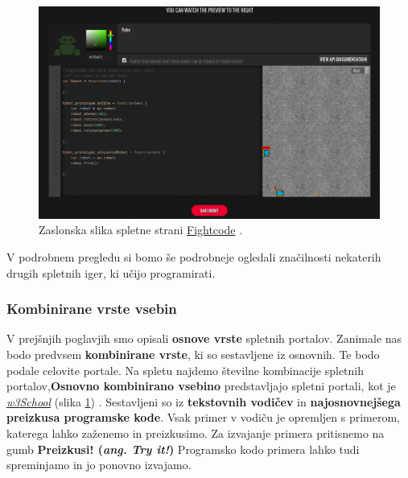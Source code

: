 \begin{figure}[h!]
    \includegraphics [width=1\linewidth, keepaspectratio =
    1] {./images/sc_web/fightRobot_01.png}
    \caption{Zaslonska slika spletne strani
      {\href{http://fightcodegame.com/}{Fightcode}}
      \cite{web:fightcode}.}
    \label{fig:scr:web:w3school}
\end{figure}

V podrobnem pregledu si bomo še podrobneje ogledali značilnosti nekaterih drugih
spletnih iger, ki učijo programirati.

\subsubsection{Kombinirane vrste vsebin}
\label{sec:kombinirane_vrste_vsebin}

V prejšnjih poglavjih smo opisali \textbf{osnove vrste} spletnih
portalov. Zanimale nas bodo predvsem \textbf{kombinirane vrste}, ki so
sestavljene iz osnovnih. Te bodo podale celovite portale. Na spletu
najdemo številne kombinacije spletnih portalov,\textbf{Osnovno
  kombinirano vsebino} predstavljajo spletni portali, kot je
\emph{\href{http://www.w3schools.com/}{w3School}} (slika
\ref{fig:scr:web:w3school}) \cite{web:w3school}. Sestavljeni so iz
\textbf{tekstovnih vodičev} in \textbf{najosnovnejšega preizkusa
  programske kode}. Vsak primer v vodiču je opremljen s primerom,
katerega lahko zaženemo in preizkusimo. Za izvajanje primera
pritisnemo na gumb \textbf{Preizkusi!  (\emph{ang. Try it!})}
Programsko kodo primera lahko tudi spreminjamo in jo ponovno izvajamo.

